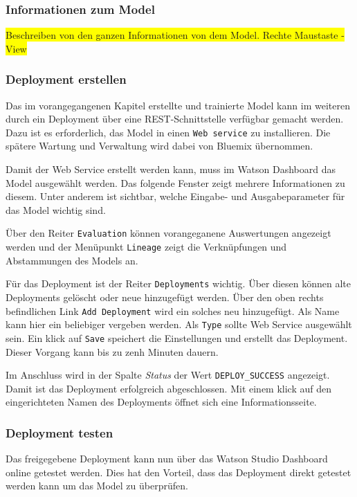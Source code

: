 \subsubsection{Informationen zum Model}
\colorbox{yellow}{Beschreiben von den ganzen Informationen von dem Model. Rechte Maustaste - View}

\subsubsection{Deployment erstellen}
Das im vorangegangenen Kapitel erstellte und trainierte Model kann im weiteren durch ein Deployment über eine
REST-Schnittstelle verfügbar gemacht werden. Dazu ist es erforderlich, das Model in einen \texttt{Web service} zu
installieren. Die spätere Wartung und Verwaltung wird dabei von Bluemix übernommen.

Damit der Web Service erstellt werden kann, muss im Watson Dashboard das Model ausgewählt werden. Das folgende Fenster
zeigt mehrere Informationen zu diesem. Unter anderem ist sichtbar, welche Eingabe- und Ausgabeparameter für das Model
wichtig sind.

Über den Reiter \texttt{Evaluation} können vorangeganene Auswertungen angezeigt werden und der Menüpunkt \texttt{Lineage}
zeigt die Verknüpfungen und Abstammungen des Models an.

Für das Deployment ist der Reiter \texttt{Deployments} wichtig. Über diesen können alte Deployments gelöscht oder neue
hinzugefügt werden. Über den oben rechts befindlichen Link \texttt{Add Deployment} wird ein solches neu hinzugefügt. Als
Name kann hier ein beliebiger vergeben werden. Als \texttt{Type} sollte Web Service ausgewählt sein. Ein klick auf
\texttt{Save} speichert die Einstellungen und erstellt das Deployment. Dieser Vorgang kann bis zu zenh Minuten dauern.

Im Anschluss wird in der Spalte \textit{Status} der Wert \texttt{DEPLOY\_SUCCESS} angezeigt. Damit ist das Deployment
erfolgreich abgeschlossen. Mit einem klick auf den eingerichteten Namen des Deployments öffnet sich eine
Informationsseite.

\subsubsection{Deployment testen}
Das freigegebene Deployment kann nun über das Watson Studio Dashboard online getestet werden. Dies hat den Vorteil, dass
das Deployment direkt getestet werden kann um das Model zu überprüfen.

